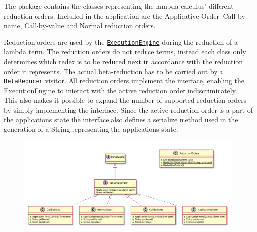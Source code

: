 The \texttt{} package contains the classes representing the lambda calculus' different reduction orders.
Included in the application are the Applicative Order, Call-by-name, Call-by-value and Normal reduction orders.

Reduction orders are used by the \texttt{\hyperref[type:edu.kit.wavelength.client.model]{ExecutionEngine}} during the reduction
of a lambda term.
The reduction orders do not reduce terms, instead each class only determines which redex is to be reduced next in accordance with the reduction order it represents.
The actual beta-reduction has to be carried out by a \texttt{\hyperref[type:edu.kit.wavelength.client.model.term.LambdaTerm]{BetaReducer}} visitor.
All reduction orders implement the \texttt{{}} interface, enabling the ExecutionEngine to interact with the active reduction order indiscriminately.
This also makes it possible to expand the number of supported reduction orders by simply implementing the interface.
Since the active reduction order is a part of the applications state the interface
also defines a serialize method used in the generation of a String representing the applications state.

\begin{figure}[H]
	\centering
	\includegraphics[width=\textwidth]{packageDiagrams/reductionPackage}
\end{figure}
